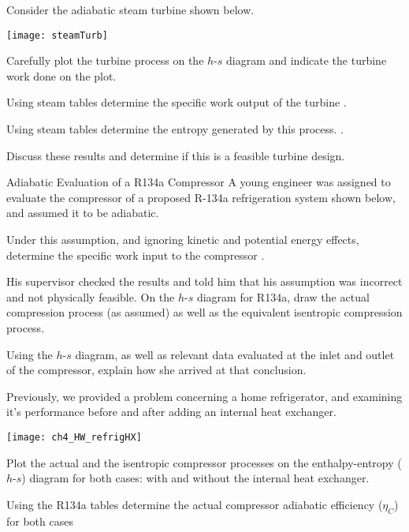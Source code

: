 \begin{homework}
  \question Consider the adiabatic steam turbine shown below.
  \begin{center}
    \texttt{[image: steamTurb]}
  \end{center}
  \begin{questionparts}
  \item Carefully plot the turbine process on the $h$-$s$ diagram and indicate the turbine work done on the plot.
  \item Using steam tables determine the specific work output of the turbine \answer{[1015 kJ/kg]}.
  \item Using steam tables determine the entropy generated by this process. \answer{[0.01 kJ/kg.K]}.
  \item Discuss these results and determine if this is a feasible turbine design.
  \end{questionparts}

  \question Adiabatic Evaluation of a R134a Compressor
  A young engineer was assigned to evaluate the compressor of a proposed R-134a refrigeration system shown below, and assumed it to be adiabatic.
  \begin{questionparts}
  \item Under this assumption, and ignoring kinetic and potential energy effects, determine the specific work input to the compressor \answer{[48.3 kJ/kg]}.
  \item His supervisor checked the results and told him that his assumption was incorrect and not physically feasible. On the $h$-$s$ diagram for R134a, draw the actual compression process (as assumed) as well as the equivalent isentropic compression process.
  \item Using the $h$-$s$ diagram, as well as relevant data evaluated at the inlet and outlet of the compressor, explain how she arrived at that conclusion.
  \end{questionparts}
  \newpage
  \question Previously, we provided a problem concerning a home refrigerator, and examining it's performance before and after adding an internal heat exchanger.
  \begin{center}
    \texttt{[image: ch4\_HW\_refrigHX]}
  \end{center}
  \begin{questionparts}
  \item Plot the actual and the isentropic compressor processes on the enthalpy-entropy ($h$-$s$) diagram for both cases: with and without the internal heat exchanger.
  \item Using the R134a tables determine the actual compressor adiabatic efficiency ($\eta_C$) for both cases \answer{[75\%, 76\%]}
  \end{questionparts}


\end{homework}

